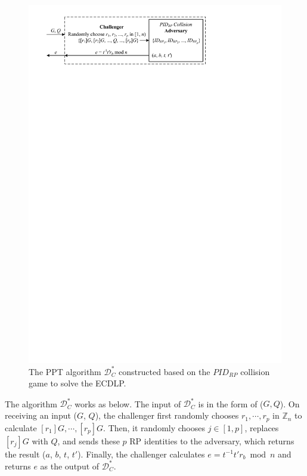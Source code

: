 \begin{figure}[tb]
  \centering
  \includegraphics[width=0.99\linewidth]{fig/ecdlp_algorithm.pdf}
  \caption{The PPT algorithm $\mathcal{D}^*_C$ constructed based on the $PID_{RP}$ collision game to solve the ECDLP.}
  \label{fig:ecdlp_algorithm}
\end{figure}

The algorithm $\mathcal{D}^*_C$ works as below.
The input of $\mathcal{D}^*_C$ is in the form of ($G, Q$). On receiving an input ($G$, $Q$), the challenger first randomly chooses $r_1, \cdots, r_p$ in $\mathbb{Z}_n$ to calculate $[r_1]G, \cdots, [r_p]G$.
Then, it randomly chooses $j \in [1,p]$, replaces $[r_j]G$ with $Q$, and sends these $p$ RP identities to the adversary, which returns the result ($a$, $b$, $t$, $t'$).
Finally, the challenger calculates $e = t^{-1}t'r_b \bmod n$ and returns $e$ as the output of $\mathcal{D}^*_C$.

